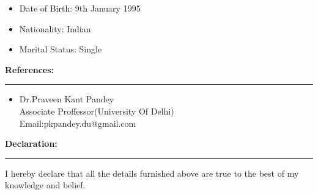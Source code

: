 \documentclass[a4paper,10pt]{article}
\begin{document}
\begin{flushleft}
\begin{itemize}
    	\item Date of Birth:     9th January 1995 \\
    	\item Nationality:       Indian\\
    	\item Marital Status:    Single\\
    \end{itemize}
     \textbf{ References: }\\
   \hrule
    
    \begin{itemize}
    	\item Dr.Praveen Kant Pandey\\
    	Associate Proffessor(University Of Delhi)\\
    	      Email:pkpandey.du@gmail.com
    	      
     \end{itemize}
     \textbf{ Declaration: }\\
      \hrule
     I hereby declare that all the details furnished above are true to the best of my knowledge and belief.
     \medskip
      
   
	\end{flushleft}
	
\end{document}
